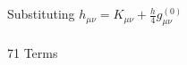 \documentclass[10pt,letterpaper]{article}
\begin{document}
\\ \\
Substituting $h_{\mu\nu} = K_{\mu\nu} + \tfrac{h}{4}g_{\mu\nu}^{(0)}$\\ \\
71 Terms
\end{document}
